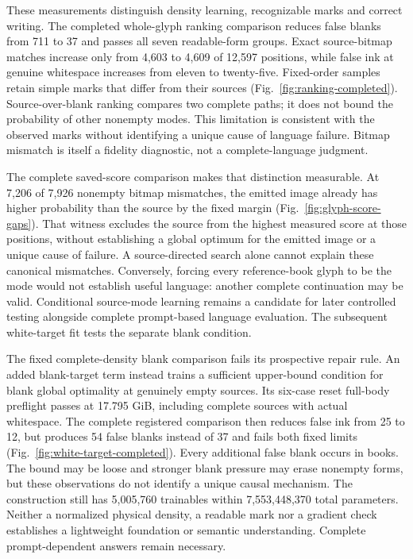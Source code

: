 \documentclass[12pt,a4paper]{article}
\providecommand{\DIFadd}[1]{{\protect\color{blue} \sf #1}} %
\begin{document}
\DIFadd{These measurements distinguish density learning, recognizable marks and correct
writing. The completed whole-glyph ranking comparison reduces false blanks from
711 to 37 and passes all seven readable-form groups. Exact source-bitmap matches
increase only from 4,603 to 4,609 of 12,597 positions, while false ink at genuine
whitespace increases from eleven to twenty-five. Fixed-order samples retain
simple marks that differ from their sources (Fig.~\ref{fig:ranking-completed}).
Source-over-blank ranking compares two complete paths; it does not bound the
probability of other nonempty modes. This limitation is consistent with the
observed marks without identifying a unique cause of language failure. Bitmap
mismatch is itself a fidelity diagnostic, not a complete-language judgment.
}

\DIFadd{The complete saved-score comparison makes that distinction measurable. At
7,206 of 7,926 nonempty bitmap mismatches, the emitted image already has higher
probability than the source by the fixed margin (Fig.~\ref{fig:glyph-score-gaps}).
That witness excludes the source from the highest measured score at those
positions, without establishing a global optimum for the emitted image or a
unique cause of failure. A source-directed search alone cannot explain these
canonical mismatches. Conversely, forcing every reference-book glyph to be the
mode would not establish useful language: another complete continuation may
be valid. Conditional source-mode learning remains a candidate for later
controlled testing alongside complete prompt-based language evaluation. The
subsequent white-target fit tests the separate blank condition.
}

\DIFadd{The fixed complete-density blank comparison fails its prospective repair rule.
An added blank-target term instead trains a sufficient upper-bound condition
for blank global optimality at genuinely empty sources. Its six-case reset
full-body preflight passes at 17.795 GiB, including complete sources with actual
whitespace. The complete registered comparison then reduces false ink from
25 to 12, but produces 54 false blanks instead of 37 and fails both fixed limits
(Fig.~\ref{fig:white-target-completed}). Every additional false blank occurs in
books. The bound may be loose and stronger blank pressure may erase nonempty
forms, but these observations do not identify a unique causal mechanism.
The construction still has 5,005,760 trainables within 7,553,448,370 total
parameters. Neither a normalized physical density, a readable mark nor a
gradient check establishes a lightweight foundation or semantic understanding.
Complete prompt-dependent answers remain necessary.
}
\end{document}
